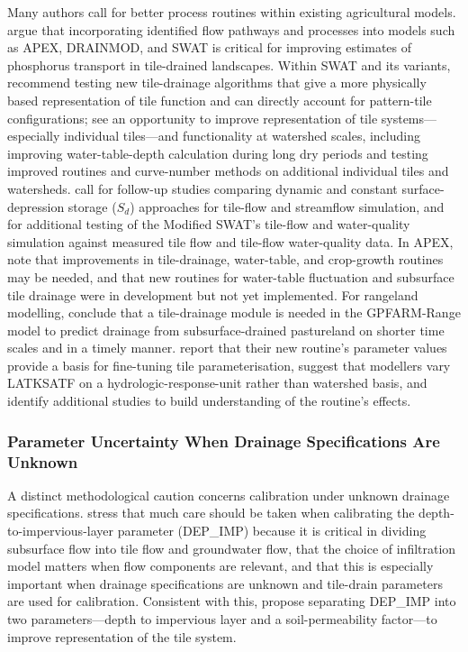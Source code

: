 Many authors call for better process routines within existing agricultural models. \textcite{Williams2016} argue that incorporating identified flow pathways and processes into models such as APEX, DRAINMOD, and SWAT is critical for improving estimates of phosphorus transport in tile-drained landscapes. Within SWAT and its variants, \textcite{Schilling2019} recommend testing new tile-drainage algorithms that give a more physically based representation of tile function and can directly account for pattern-tile configurations; \textcite{Guo2018b} see an opportunity to improve representation of tile systems---especially individual tiles---and functionality at watershed scales, including improving water-table-depth calculation during long dry periods and testing improved routines and curve-number methods on additional individual tiles and watersheds. \textcite{Moriasi2012} call for follow-up studies comparing dynamic and constant surface-depression storage ($S_d$) approaches for tile-flow and streamflow simulation, and for additional testing of the Modified SWAT's tile-flow and water-quality simulation against measured tile flow and tile-flow water-quality data. In APEX, \textcite{Nelson2018} note that improvements in tile-drainage, water-table, and crop-growth routines may be needed, and that new routines for water-table fluctuation and subsurface tile drainage were in development but not yet implemented. For rangeland modelling, \textcite{Chen2016} conclude that a tile-drainage module is needed in the GPFARM-Range model to predict drainage from subsurface-drained pastureland on shorter time scales and in a timely manner. \textcite{Boles2015} report that their new routine's parameter values provide a basis for fine-tuning tile parameterisation, suggest that modellers vary LATKSATF on a hydrologic-response-unit rather than watershed basis, and identify additional studies to build understanding of the routine's effects.

\subsubsection{Parameter Uncertainty When Drainage Specifications Are Unknown}

A distinct methodological caution concerns calibration under unknown drainage specifications. \textcite{Bauwe2016} stress that much care should be taken when calibrating the depth-to-impervious-layer parameter (DEP\_IMP) because it is critical in dividing subsurface flow into tile flow and groundwater flow, that the choice of infiltration model matters when flow components are relevant, and that this is especially important when drainage specifications are unknown and tile-drain parameters are used for calibration. Consistent with this, \textcite{Guo2018b} propose separating DEP\_IMP into two parameters---depth to impervious layer and a soil-permeability factor---to improve representation of the tile system.

